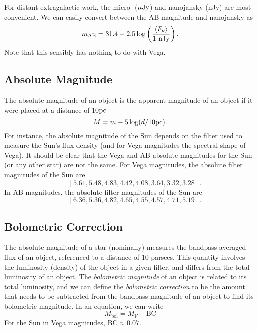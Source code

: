 \documentclass[12pt]{article}
\begin{document}
For distant extragalactic work, the micro- ($\mu\mathrm{Jy}$) and nanojansky (nJy) are most convenient.
We can easily convert between the AB magnitude and nanojansky as
\begin{equation}
m_{\mathrm{AB}} = 31.4 - 2.5 \log \left(\frac{\langle F_{\nu}\rangle}{1~\mathrm{nJy}}\right).
\end{equation}
\noindent
Note that this sensibly has nothing to do with Vega.

\subsection{Absolute Magnitude}
The absolute magnitude of an object is the apparent magnitude of
an object if it were placed at a distance of 10$\mathrm{pc}$
\begin{equation}
\label{eqn:absolute_magnitude}
M = m - 5\log(d/10\mathrm{pc}).
\end{equation}
\noindent
For instance, the absolute magnitude of the Sun depends on the
filter used to measure the Sun's flux density (and for Vega
magnitudes the spectral shape of Vega). It should be clear that
the Vega and AB absolute magnitudes for the Sun (or any other star)
are not the same. For Vega magnitudes, the absolute filter magnitudes of
the Sun are
\begin{equation}
[U,B,V,R,I,J,H,K]=[5.61,5.48,4.83,4.42,4.08,3.64,3.32,3.28].
\end{equation}
\noindent
In AB magnitudes, the absolute filter magnitudes of the
Sun are 
\begin{equation}
[U,B,V,R,I,J,H,K] = [6.36,5.36,4.82,4.65,4.55,4.57,4.71,5.19].
\end{equation}

\subsection{Bolometric Correction}

The absolute magnitude of a star (nominally) measures the bandpass
averaged flux of an object, referenced to a distance of 10 parsecs.
This quantity involves the luminosity (density) of the object in a given 
filter, and differs from the total luminosity of an object. The {\it bolometric
magnitude} of an object is related to its total luminosity, and we can define
the {\it bolometric correction} to be the amount that needs to be subtracted
from the bandpass magnitude of an object to find its bolometric magnitude.
In an equation, we can write
\begin{equation}
M_{\mathrm{bol}} = M_V - \mathrm{BC}
\end{equation}
For the Sun in Vega magnitudes, $\mathrm{BC}\approx0.07$.
\end{document}
